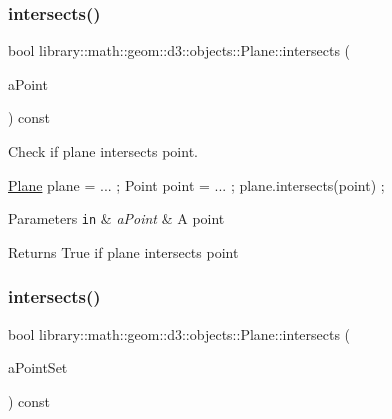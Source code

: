 \subsubsection{\texorpdfstring{intersects()}{intersects()}\hspace{0.1cm}{\footnotesize\ttfamily [1/5]}}
{\footnotesize\ttfamily bool library\+::math\+::geom\+::d3\+::objects\+::\+Plane\+::intersects (\begin{DoxyParamCaption}\item[{const \hyperlink{classlibrary_1_1math_1_1geom_1_1d3_1_1objects_1_1_point}{Point} \&}]{a\+Point }\end{DoxyParamCaption}) const}



Check if plane intersects point. 


\begin{DoxyCode}
\hyperlink{classlibrary_1_1math_1_1geom_1_1d3_1_1objects_1_1_plane_a81fe78a983e2cb6ee6ad9bfabd22c3a4}{Plane} plane = ... ;
Point point = ... ;
plane.intersects(point) ;
\end{DoxyCode}



\begin{DoxyParams}[1]{Parameters}
\mbox{\tt in}  & {\em a\+Point} & A point \\
\hline
\end{DoxyParams}
\begin{DoxyReturn}{Returns}
True if plane intersects point 
\end{DoxyReturn}
\mbox{\label{classlibrary_1_1math_1_1geom_1_1d3_1_1objects_1_1_plane_a9e7453854756a84f931f470ddf39c4c7}} 
\subsubsection{\texorpdfstring{intersects()}{intersects()}\hspace{0.1cm}{\footnotesize\ttfamily [2/5]}}
{\footnotesize\ttfamily bool library\+::math\+::geom\+::d3\+::objects\+::\+Plane\+::intersects (\begin{DoxyParamCaption}\item[{const \hyperlink{classlibrary_1_1math_1_1geom_1_1d3_1_1objects_1_1_point_set}{Point\+Set} \&}]{a\+Point\+Set }\end{DoxyParamCaption}) const}



